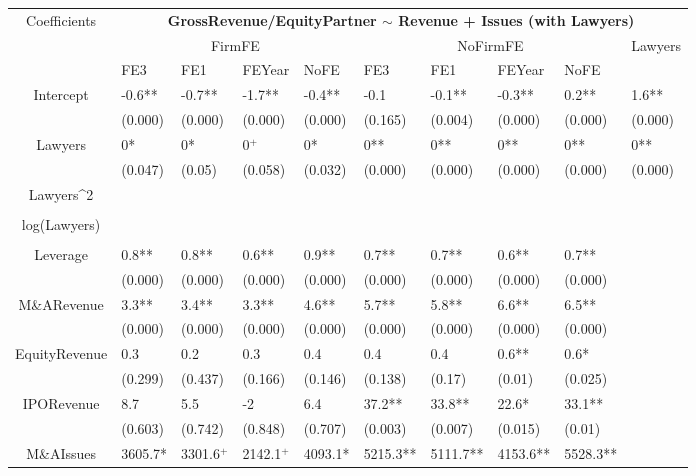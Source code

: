 \documentclass{article}
\begin{document}
\begin{table}[H]
\centering
\begin{tabular}{|clllllllll|}
\hline
\multirow{3}{*}{Coefficients} & \multicolumn{9}{c|}{\textbf{GrossRevenue/EquityPartner $\sim$ Revenue + Issues (with Lawyers)}} \\
\cline{2-10}
& \multicolumn{4}{c}{FirmFE} & \multicolumn{4}{c}{NoFirmFE} & \multirow{2}{*}{Lawyers} \\
\cline{2-9}
& FE3 & FE1 & FEYear & NoFE & FE3 & FE1 & FEYear & NoFE &  \\
\hline
 
Intercept & -0.6** & -0.7** & -1.7** & -0.4** & -0.1 & -0.1** & -0.3** & 0.2** & 1.6** \\ 
   & (0.000) & (0.000) & (0.000) & (0.000) & (0.165) & (0.004) & (0.000) & (0.000) & (0.000) \\ 
  Lawyers & 0* & 0* & 0$^{+}$ & 0* & 0** & 0** & 0** & 0** & 0** \\ 
   & (0.047) & (0.05) & (0.058) & (0.032) & (0.000) & (0.000) & (0.000) & (0.000) & (0.000) \\ 
  Lawyers^2 &  &  &  &  &  &  &  &  &  \\ 
   &  &  &  &  &  &  &  &  &  \\ 
  log(Lawyers) &  &  &  &  &  &  &  &  &  \\ 
   &  &  &  &  &  &  &  &  &  \\ 
  Leverage & 0.8** & 0.8** & 0.6** & 0.9** & 0.7** & 0.7** & 0.6** & 0.7** &  \\ 
   & (0.000) & (0.000) & (0.000) & (0.000) & (0.000) & (0.000) & (0.000) & (0.000) &  \\ 
  M\&ARevenue & 3.3** & 3.4** & 3.3** & 4.6** & 5.7** & 5.8** & 6.6** & 6.5** &  \\ 
   & (0.000) & (0.000) & (0.000) & (0.000) & (0.000) & (0.000) & (0.000) & (0.000) &  \\ 
  EquityRevenue & 0.3 & 0.2 & 0.3 & 0.4 & 0.4 & 0.4 & 0.6** & 0.6* &  \\ 
   & (0.299) & (0.437) & (0.166) & (0.146) & (0.138) & (0.17) & (0.01) & (0.025) &  \\ 
  IPORevenue & 8.7 & 5.5 & -2 & 6.4 & 37.2** & 33.8** & 22.6* & 33.1** &  \\ 
   & (0.603) & (0.742) & (0.848) & (0.707) & (0.003) & (0.007) & (0.015) & (0.01) &  \\ 
  M\&AIssues & 3605.7* & 3301.6$^{+}$ & 2142.1$^{+}$ & 4093.1* & 5215.3** & 5111.7** & 4153.6** & 5528.3** &  \\ 

\end{tabular}
\end{table}
\end{document}
